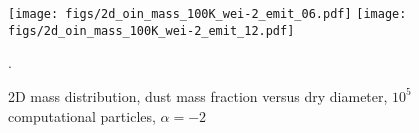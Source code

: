 \documentclass{article}
\begin{document}
\begin{figure}
  \begin{center}
    \texttt{[image: figs/2d\_oin\_mass\_100K\_wei-2\_emit\_06.pdf]}
    \texttt{[image: figs/2d\_oin\_mass\_100K\_wei-2\_emit\_12.pdf]}
  \end{center}
  \caption{\label{fig:1d_wc_100K} 2D mass distribution, dust mass
    fraction versus dry diameter, $10^5$ computational particles,
    $\alpha = -2$}.
\end{figure}
\end{document}
